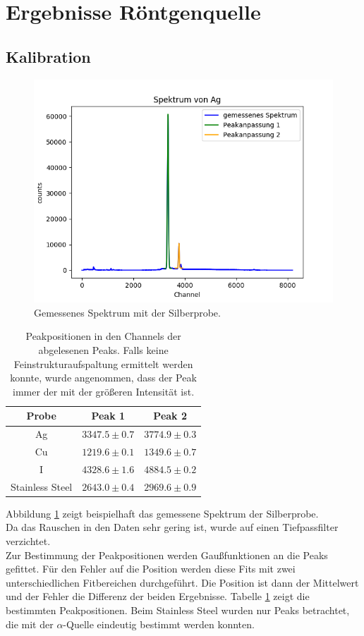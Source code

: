 \documentclass[12pt,a4paper]{article}
\begin{document}
\section{Ergebnisse Röntgenquelle}
\subsection{Kalibration}
\begin{figure}
\centering
\includegraphics[scale=0.8]{Bilder/roentgen/Kalibration/Ag_gesamt.png}
\caption{Gemessenes Spektrum mit der Silberprobe.}
\label{fig:röntgen_AgSpektrum}
\end{figure}

\begin{table}
\centering
\begin{tabular}{|c|c|c|}
\hline 
Probe & Peak 1 & Peak 2 \\ 
\hline 
Ag & $3347.5\pm0.7$ & $3774.9\pm0.3$ \\ 
\hline 
Cu & $1219.6\pm0.1$ & $1349.6\pm0.7$ \\ 
\hline 
I & $4328.6\pm1.6$ & $4884.5\pm0.2$ \\ 
\hline 
Stainless Steel & $2643.0\pm0.4$ & $2969.6\pm0.9$ \\ 
\hline 
\end{tabular} 
\caption{Peakpositionen in den Channels der abgelesenen Peaks. Falls keine Feinstrukturaufspaltung ermittelt werden konnte, wurde angenommen, dass der Peak immer der mit der größeren Intensität ist.}
\label{tab:röntgen_kal}
\end{table}

Abbildung \ref{fig:röntgen_AgSpektrum} zeigt beispielhaft das gemessene Spektrum der Silberprobe. \\
Da das Rauschen in den Daten sehr gering ist, wurde auf einen Tiefpassfilter verzichtet. \\
Zur Bestimmung der Peakpositionen werden Gaußfunktionen an die Peaks gefittet. Für den Fehler auf die Position werden diese Fits mit zwei unterschiedlichen Fitbereichen durchgeführt. Die Position ist dann der Mittelwert und der Fehler die Differenz der beiden Ergebnisse. Tabelle \ref{tab:röntgen_kal} zeigt die bestimmten Peakpositionen. Beim Stainless Steel wurden nur Peaks betrachtet, die mit der $\alpha$-Quelle eindeutig bestimmt werden konnten.
\end{document}

